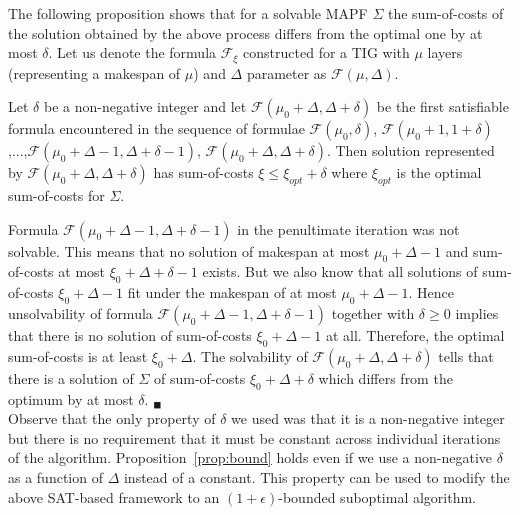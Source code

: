 \documentclass[letterpaper]{article}
\begin{document}
The following proposition shows that for a solvable MAPF $\Sigma$ the sum-of-costs
of the solution obtained by the above process differs from the optimal one by
at most $\delta$. Let us denote the formula $\mathcal{F}_\xi$ constructed for a TIG with $\mu$ layers (representing a makespan of $\mu$) and $\Delta$ parameter as $\mathcal{F}(\mu,\Delta)$.


\begin{proposition}
Let $\delta$ be a non-negative integer and
let $\mathcal{F}(\mu_0+\Delta,\Delta+\delta)$ be the first satisfiable formula
encountered in the sequence of formulae $\mathcal{F}(\mu_0,\delta)$,
$\mathcal{F}(\mu_0+1,1+\delta)$,...,$\mathcal{F}(\mu_0+\Delta-1,\Delta+\delta-1)$,
$\mathcal{F}(\mu_0+\Delta,\Delta+\delta)$. Then solution represented by
$\mathcal{F}(\mu_0+\Delta,\Delta+\delta)$ has sum-of-costs $\xi \leq \xi_{opt} +
\delta$ where $\xi_{opt}$ is the optimal sum-of-costs for $\Sigma$.
\label{prop:bound}
\end{proposition}

 Formula $\mathcal{F}(\mu_0+\Delta-1,\Delta+\delta-1)$ in the penultimate iteration was not solvable. This means that no solution of makespan at most $\mu_0+\Delta-1$ and sum-of-costs at most $\xi_0+\Delta+\delta - 1$ exists. But we also know that all solutions of sum-of-costs $\xi_0+\Delta-1$ fit under the makespan of at most $\mu_0+\Delta-1$. Hence unsolvability of formula $\mathcal{F}(\mu_0+\Delta-1,\Delta+\delta-1)$ together with $\delta \geq 0$ implies that there is no solution of sum-of-costs $\xi_0+\Delta-1$ at all. Therefore, the optimal sum-of-costs is at least $\xi_0+\Delta$. The solvability of $\mathcal{F}(\mu_0+\Delta,\Delta+\delta)$ tells that there is a solution of $\Sigma$ of sum-of-costs  $\xi_0+\Delta+\delta$ which differs from the optimum by at most $\delta$. $_\blacksquare$\\


Observe that the only property of $\delta$ we used was that it is a
non-negative integer but there is no requirement that it must be constant
across individual iterations of the algorithm. Proposition~\ref{prop:bound} holds
even if we use a non-negative $\delta$ as a function of $\Delta$ instead of a
constant. This property can be used to modify the above SAT-based framework to
an $(1+\epsilon)$-bounded suboptimal algorithm. %
\end{document}
